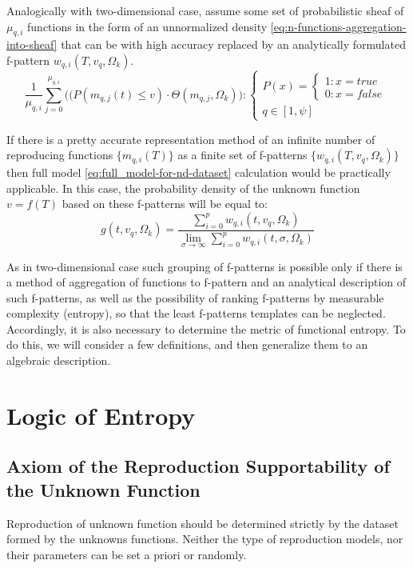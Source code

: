 \documentclass[a4paper, 11pt, oneside]{book}
\begin{document}
Analogically with two-dimensional case, assume some set of probabilistic sheaf of $\mu_{q, i}$ functions in the form of an unnormalized density \ref{eq:n-functions-aggregation-into-sheaf} that can be with high accuracy replaced by an analytically formulated f-pattern $w_{q, i}(T, v_q, \Omega_k)$.
\begin{equation}\label{eq:n-functions-aggregation-into-sheaf}
  \frac{1}{\mu_{q, i}} \sum_{j = 0}^{\mu_{q, i}} \Big((P(m_{q, j}(t) \leq v) \cdot \Theta(m_{q, j}, \Omega_k) \Big):
  \begin{cases}
    P(x) =
    \begin{cases}
      1: x = true\\
      0: x = false
    \end{cases} \\
    q \in [1, \psi]
  \end{cases}
\end{equation}

If there is a pretty accurate representation method of an infinite number of reproducing functions $\{m_{q, i}(T)\}$ as a finite set of f-patterns $\{w_{q, i}(T, v_q, \Omega_k)\}$ then full model \ref{eq:full_model-for-nd-dataset} calculation would be practically applicable. In this case, the probability density of the unknown function $v=f(T)$ based on these f-patterns will be equal to:
\begin{equation}\label{eq:full_model-for-nd-dataset-by-f-patterns}
  g(t, v_q, \Omega_k) = \frac{\displaystyle \sum_{i = 0}^p w_{q, i}(t, v_q, \Omega_k)}{\displaystyle \lim_{\sigma \to \infty}\sum_{i = 0}^p w_{q, i}(t, \sigma, \Omega_k)}
\end{equation}

As in two-dimensional case such grouping of f-patterns is possible only if there is a method of aggregation of functions to f-pattern and an analytical description of such f-patterns, as well as the possibility of ranking f-patterns by measurable complexity (entropy), so that the least f-patterns templates can be neglected. Accordingly, it is also necessary to determine the metric of functional entropy. To do this, we will consider a few definitions, and then generalize them to an algebraic description.

\section{Logic of Entropy}
\subsection{Axiom of the Reproduction Supportability of the Unknown Function}\label{subs:axiom-of-the-reproduction}
Reproduction of unknown function should be determined strictly by the dataset formed by the unknowns functions. Neither the type of reproduction models, nor their parameters can be set a priori or randomly.
\end{document}
